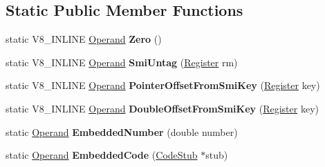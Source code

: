 \subsection*{Static Public Member Functions}
\begin{DoxyCompactItemize}
\item 
\mbox{\label{classv8_1_1internal_1_1Operand_a8719476aaceaa8dd20362ea00fd588c8}} 
static V8\+\_\+\+I\+N\+L\+I\+NE \mbox{\hyperlink{classv8_1_1internal_1_1Operand}{Operand}} {\bfseries Zero} ()
\item 
\mbox{\label{classv8_1_1internal_1_1Operand_a502974af2a648b7688919d1ed9e99eb7}} 
static V8\+\_\+\+I\+N\+L\+I\+NE \mbox{\hyperlink{classv8_1_1internal_1_1Operand}{Operand}} {\bfseries Smi\+Untag} (\mbox{\hyperlink{classv8_1_1internal_1_1Register}{Register}} rm)
\item 
\mbox{\label{classv8_1_1internal_1_1Operand_a7a8d199a291289f2d164588d70bbd0fa}} 
static V8\+\_\+\+I\+N\+L\+I\+NE \mbox{\hyperlink{classv8_1_1internal_1_1Operand}{Operand}} {\bfseries Pointer\+Offset\+From\+Smi\+Key} (\mbox{\hyperlink{classv8_1_1internal_1_1Register}{Register}} key)
\item 
\mbox{\label{classv8_1_1internal_1_1Operand_aab94bf7a2d376fa83419edac5e828485}} 
static V8\+\_\+\+I\+N\+L\+I\+NE \mbox{\hyperlink{classv8_1_1internal_1_1Operand}{Operand}} {\bfseries Double\+Offset\+From\+Smi\+Key} (\mbox{\hyperlink{classv8_1_1internal_1_1Register}{Register}} key)
\item 
\mbox{\label{classv8_1_1internal_1_1Operand_acf6f1fd77d9ac5d43608db185e9ee29b}} 
static \mbox{\hyperlink{classv8_1_1internal_1_1Operand}{Operand}} {\bfseries Embedded\+Number} (double number)
\item 
\mbox{\label{classv8_1_1internal_1_1Operand_a3c9527809810de0034efe67b914f9ee1}} 
static \mbox{\hyperlink{classv8_1_1internal_1_1Operand}{Operand}} {\bfseries Embedded\+Code} (\mbox{\hyperlink{classv8_1_1internal_1_1CodeStub}{Code\+Stub}} $\ast$stub)
\item 
\mbox{\label{classv8_1_1internal_1_1Operand_aed8c3e6c09f724bdfb40c4705b89bc83}} 

\end{DoxyCompactItemize}
